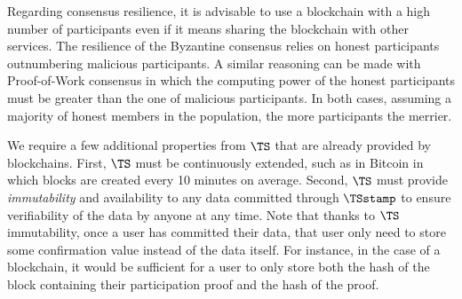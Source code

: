 Regarding consensus resilience, it is advisable to use a blockchain with a high number of participants even if it means sharing the blockchain with other services.
The resilience of the Byzantine consensus relies on honest participants outnumbering malicious participants.
A similar reasoning can be made with Proof-of-Work consensus in which the computing power of the honest participants must be greater than the one of malicious participants.
In both cases, assuming a majority of honest members in the population, the more participants the merrier.

We require a few additional properties from \(\TS\) that are already provided by blockchains.
First, \(\TS\) must be continuously extended, such as in Bitcoin in which blocks are created every 10 minutes on average.
Second, \(\TS\) must provide \emph{immutability} and availability to any data committed through \(\TSstamp\) to ensure verifiability of the data by anyone at any time.
Note that thanks to \(\TS\) immutability, once a user has committed their data, that user only need to store some confirmation value instead of the data itself.
For instance, in the case of a blockchain, it would be sufficient for a user to only store both the hash of the block containing their participation proof and the hash of the proof. 

